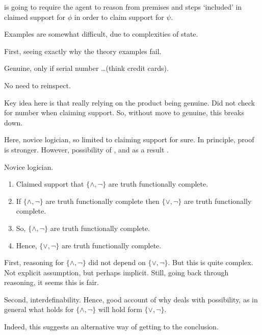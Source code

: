 \begin{note}
  \ESU{} is going to require the agent to reason from premises and steps `included' in claimed support for \(\phi\) in order to claim support for \(\psi\).
\end{note}

\begin{note}[Examples]
  Examples are somewhat difficult, due to complexities of state.
\end{note}

\begin{note}
  First, seeing exactly why the theory examples fail.
\end{note}

\begin{note}
  \begin{illustration}
    \label{illu:number-check}
    Genuine, only if serial number \dots (think credit cards).
  \end{illustration}
  No need to reinspect.

  Key idea here is that really relying on the product being genuine.
  Did not check for number when claiming support.
  So, without move to genuine, this breaks down.
\end{note}


\begin{note}[Logician]
  Here, novice logician, so limited to claiming support for sure.
  In principle, proof is stronger.
  However, possibility of \mistaken{}, and as a result \misled{}.
  \begin{illustration}\label{illu:CS:tfc}
    Novice logician.
    \begin{enumerate}
    \item Claimed support that \(\{\land,\lnot\}\) are truth functionally complete.
    \item If \(\{\land,\lnot\}\) are truth functionally complete then \(\{\lor,\lnot\}\) are truth functionally complete.
    \item So, \(\{\land,\lnot\}\) are truth functionally complete.
    \item Hence, \(\{\lor,\lnot\}\) are truth functionally complete.
    \end{enumerate}
  \end{illustration}

  First, reasoning for \(\{\land,\lnot\}\) did not depend on \(\{\lor,\lnot\}\).
  But this is quite complex.
  Not explicit assumption, but perhaps implicit.
  Still, going back through reasoning, it seems this is fair.

  Second, interdefinability.
  Hence, good account of why deals with possibility, as in general what holds for \(\{\land,\lnot\}\) will hold form \(\{\lor,\lnot\}\).

  Indeed, this suggests an alternative way of getting to the conclusion.
\end{note}

